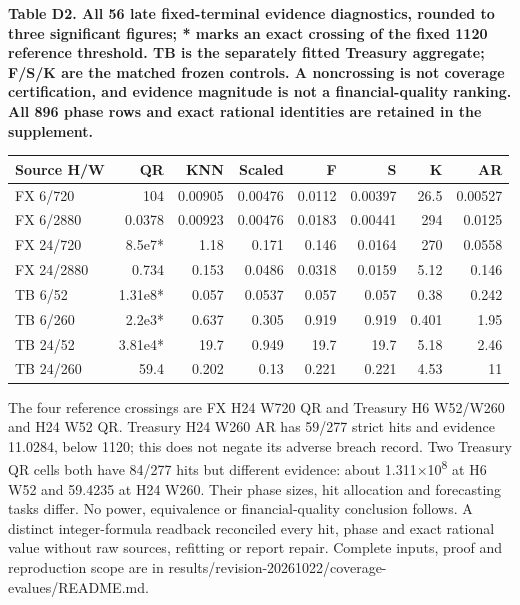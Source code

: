 \documentclass[10pt,a4paper]{article}
\begin{document}
\begin{center}
\begin{minipage}{\linewidth}
\small\textbf{Table D2. All 56 late fixed-terminal evidence diagnostics, rounded to three significant figures; * marks an exact crossing of the fixed 1120 reference threshold. TB is the separately fitted Treasury aggregate; F/S/K are the matched frozen controls. A noncrossing is not coverage certification, and evidence magnitude is not a financial-quality ranking. All 896 phase rows and exact rational identities are retained in the supplement.}\par\medskip
\centering\fontsize{8}{10}\selectfont
\begin{tabular}{lrrrrrrr}
\toprule
Source H/W & QR & KNN & Scaled & F & S & K & AR \\
\midrule
FX 6/720 & 104 & 0.00905 & 0.00476 & 0.0112 & 0.00397 & 26.5 & 0.00527 \\
FX 6/2880 & 0.0378 & 0.00923 & 0.00476 & 0.0183 & 0.00441 & 294 & 0.0125 \\
FX 24/720 & 8.5e7* & 1.18 & 0.171 & 0.146 & 0.0164 & 270 & 0.0558 \\
FX 24/2880 & 0.734 & 0.153 & 0.0486 & 0.0318 & 0.0159 & 5.12 & 0.146 \\
TB 6/52 & 1.31e8* & 0.057 & 0.0537 & 0.057 & 0.057 & 0.38 & 0.242 \\
TB 6/260 & 2.2e3* & 0.637 & 0.305 & 0.919 & 0.919 & 0.401 & 1.95 \\
TB 24/52 & 3.81e4* & 19.7 & 0.949 & 19.7 & 19.7 & 5.18 & 2.46 \\
TB 24/260 & 59.4 & 0.202 & 0.13 & 0.221 & 0.221 & 4.53 & 11 \\
\bottomrule
\end{tabular}
\end{minipage}
\end{center}
The four reference crossings are FX H24 W720 QR and Treasury H6 W52/W260 and H24 W52 QR. Treasury H24 W260 AR has 59/277 strict hits and evidence 11.0284, below 1120; this does not negate its adverse breach record. Two Treasury QR cells both have 84/277 hits but different evidence: about 1.311×10\textsuperscript{8} at H6 W52 and 59.4235 at H24 W260. Their phase sizes, hit allocation and forecasting tasks differ. No power, equivalence or financial-quality conclusion follows. A distinct integer-formula readback reconciled every hit, phase and exact rational value without raw sources, refitting or report repair. Complete inputs, proof and reproduction scope are in results/revision-20261022/coverage-evalues/README.md.
\end{document}
